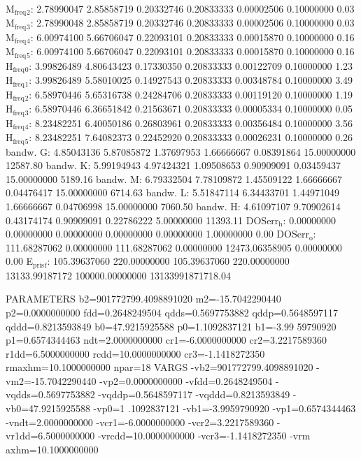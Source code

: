 \documentclass[11pt]{article}
\begin{document}
M\(_{\text{freq}}\)\(_{\text{2}}\):   2.78990047   2.85858719   0.20332746   0.20833333   0.00002506   0.10000000         0.03
M\(_{\text{freq}}\)\(_{\text{3}}\):   2.78990048   2.85858719   0.20332746   0.20833333   0.00002506   0.10000000         0.03
M\(_{\text{freq}}\)\(_{\text{4}}\):   6.00974100   5.66706047   0.22093101   0.20833333   0.00015870   0.10000000         0.16
M\(_{\text{freq}}\)\(_{\text{5}}\):   6.00974100   5.66706047   0.22093101   0.20833333   0.00015870   0.10000000         0.16
H\(_{\text{freq}}\)\(_{\text{0}}\):   3.99826489   4.80643423   0.17330350   0.20833333   0.00122709   0.10000000         1.23
H\(_{\text{freq}}\)\(_{\text{1}}\):   3.99826489   5.58010025   0.14927543   0.20833333   0.00348784   0.10000000         3.49
H\(_{\text{freq}}\)\(_{\text{2}}\):   6.58970446   5.65316738   0.24284706   0.20833333   0.00119120   0.10000000         1.19
H\(_{\text{freq}}\)\(_{\text{3}}\):   6.58970446   6.36651842   0.21563671   0.20833333   0.00005334   0.10000000         0.05
H\(_{\text{freq}}\)\(_{\text{4}}\):   8.23482251   6.40050186   0.26803961   0.20833333   0.00356484   0.10000000         3.56
H\(_{\text{freq}}\)\(_{\text{5}}\):   8.23482251   7.64082373   0.22452920   0.20833333   0.00026231   0.10000000         0.26
bandw. G:   4.85043136   5.87085872   1.37697953   1.66666667   0.08391864  15.00000000     12587.80
bandw. K:   5.99194943   4.97424321   1.09508653   0.90909091   0.03459437  15.00000000      5189.16
bandw. M:   6.79332504   7.78109872   1.45509122   1.66666667   0.04476417  15.00000000      6714.63
bandw. L:   5.51847114   6.34433701   1.44971049   1.66666667   0.04706998  15.00000000      7060.50
bandw. H:   4.61097107   9.70902614   0.43174174   0.90909091   0.22786222   5.00000000     11393.11
DOSerr\(_{\text{h}}\):   0.00000000   0.00000000   0.00000000   0.00000000   0.00000000   1.00000000         0.00
DOSerr\(_{\text{o}}\): 111.68287062   0.00000000 111.68287062   0.00000000 12473.06358905   0.00000000         0.00
E\(_{\text{pris}}\)\(_{\text{f}}\): 105.39637060 220.00000000 105.39637060 220.00000000 13133.99187172 100000.00000000 13133991871718.04


PARAMETERS
  b2=901772799.4098891020 m2=-15.7042290440 p2=0.0000000000 fdd=0.2648249504 qdds=0.5697753882 qddp=0.5648597117 qddd=0.8213593849 b0=47.9215925588 p0=1.1092837121 b1=-3.99
59790920 p1=0.6574344463 ndt=2.0000000000 cr1=-6.0000000000 cr2=3.2217589360 r1dd=6.5000000000 rcdd=10.0000000000 cr3=-1.1418272350 rmaxhm=10.1000000000 npar=18 
VARGS
    -vb2=901772799.4098891020 -vm2=-15.7042290440 -vp2=0.0000000000 -vfdd=0.2648249504 -vqdds=0.5697753882 -vqddp=0.5648597117 -vqddd=0.8213593849 -vb0=47.9215925588 -vp0=1
.1092837121 -vb1=-3.9959790920 -vp1=0.6574344463 -vndt=2.0000000000 -vcr1=-6.0000000000 -vcr2=3.2217589360 -vr1dd=6.5000000000 -vrcdd=10.0000000000 -vcr3=-1.1418272350 -vrm
axhm=10.1000000000 
\end{document}

